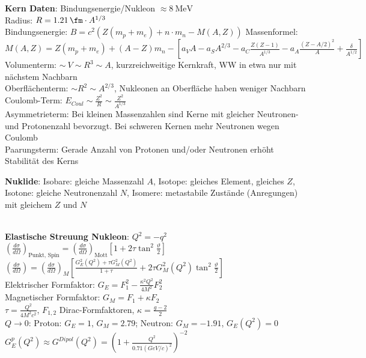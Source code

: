 \documentclass[10pt,twoside,a4paper]{article}
\begin{document}
\begin{multicols*}{3}
\textbf{Kern Daten}: Bindungsenergie/Nukleon $\approx \SI{8}{\mega\eV}$ \\
Radius: $R = \SI{1.21}{\fm} \cdot A^{1/3}$ \\
Bindungsenergie: $B = c^2 \left( Z (m_p + m_e) + n \cdot m_n - M(A, Z) \right)$
Massenformel: $M\left( A, Z \right) = Z \left( m_p + m_e \right) + \left( A - Z \right) m_n - \left[ a_V A - a_S A^{2/3} - a_C \frac{Z(Z-1)}{A^{1/3}} - a_A \frac{(Z - A/2)^2}{A} + \frac{\delta}{A^{1/2}} \right]$ \\
Volumenterm: $\sim\ V \sim R^3 \sim A$, kurzreichweitige Kernkraft, WW in etwa nur mit nächstem Nachbarn \\
Oberflächenterm: $\sim R^2 \sim A^{2/3}$, Nukleonen an Oberfläche haben weniger Nachbarn \\
Coulomb-Term: $E_{Coul} \sim \frac{Z^2}{R} \sim \frac{Z^2}{A^{1/3}}$ \\
Asymmetrieterm: Bei kleinen Massenzahlen sind Kerne mit gleicher Neutronen- und Protonenzahl bevorzugt. Bei schweren Kernen mehr Neutronen wegen Coulomb \\
Paarungsterm: Gerade Anzahl von Protonen und/oder Neutronen erhöht Stabilität des Kerns 

\textbf{Nuklide}: Isobare: gleiche Massenzahl $A$, Isotope: gleiches Element, gleiches $Z$, Isotone: gleiche Neutronenzahl $N$, Isomere: metastabile Zustände (Anregungen) mit gleichem $Z$ und $N$

\ \\
\textbf{Elastische Streuung Nukleon}: $Q^2 = -q^2$ \\
$\left(\frac{d\sigma}{d\Omega}\right)_{\text{Punkt, Spin}} = \left(\frac{d\sigma}{d\Omega}\right)_{\text{Mott}} \left[ 1 + 2 \tau \tan^2 \frac{\vartheta}{2} \right]$ \\
$\left(\frac{d\sigma}{d\Omega}\right) = \left(\frac{d\sigma}{d\Omega}\right)_{M} \left[ \frac{G^2_E(Q^2) + \tau G^2_M(Q^2)}{1 + \tau} + 2 \tau G^2_M(Q^2) \tan^2 \frac{\vartheta}{2} \right]$ \\
Elektrischer Formfaktor: $G_E = F^2_1 - \frac{\kappa^2 Q^2}{4 M^2} F^2_2$ \\
Magnetischer Formfaktor: $G_M = F_1 + \kappa F_2$ \\
$\tau = \frac{Q^2}{4M^2 c^2}$, $F_{1,2}$ Dirac-Formfaktoren, $\kappa = \frac{g-2}{2}$ \\
$Q \to 0$: Proton: $G_E=1$, $G_M=2.79$; Neutron: $G_M=-1.91$, $G_E(Q^2)=0$ \\
$G^p_E(Q^2) \approx G^{Dipol}(Q^2) = \left(1 + \frac{Q^2}{0.71 (GeV/c)^2}\right)^{-2}$


\end{multicols*}
\end{document}
